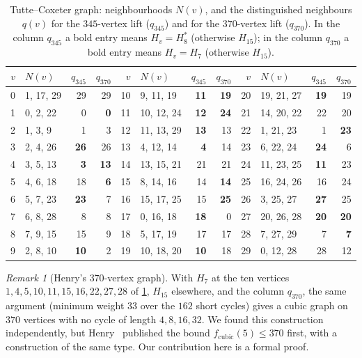 \documentclass[11pt]{amsart}
\theoremstyle{definition}
\theoremstyle{remark}
\newtheorem{remark}[theorem]{Remark}
\newcommand{\fc}{f_{\mathrm{cubic}}}
\newcommand{\Hseven}{H_7}
\newcommand{\Hfifteen}{H_{15}}
\newcommand{\Height}{H_8^{*}}
\begin{document}
\begin{table}[ht]
\centering
\caption{Tutte--Coxeter graph: neighbourhoods $N(v)$, and the distinguished
neighbours $q(v)$ for the $345$-vertex lift ($q_{345}$) and for the $370$-vertex
lift ($q_{370}$). In the column $q_{345}$ a bold entry means $H_v=\Height$
(otherwise $\Hfifteen$); in the column $q_{370}$ a bold entry means
$H_v=\Hseven$ (otherwise $\Hfifteen$).}
\label{tab:tc}
\footnotesize
\begin{tabular}{@{}rlrr@{\hspace{2.2em}}rlrr@{\hspace{2.2em}}rlrr@{}}
\toprule
$v$ & $N(v)$ & $q_{345}$ & $q_{370}$ & $v$ & $N(v)$ & $q_{345}$ & $q_{370}$ & $v$ & $N(v)$ & $q_{345}$ & $q_{370}$\\
\midrule
0 & 1, 17, 29 & 29 & 29 & 10 & 9, 11, 19 & \textbf{11} & \textbf{19} & 20 & 19, 21, 27 & \textbf{19} & 19\\
1 & 0, 2, 22 & 0 & \textbf{0} & 11 & 10, 12, 24 & \textbf{12} & \textbf{24} & 21 & 14, 20, 22 & 22 & 20\\
2 & 1, 3, 9 & 1 & 3 & 12 & 11, 13, 29 & \textbf{13} & 13 & 22 & 1, 21, 23 & 1 & \textbf{23}\\
3 & 2, 4, 26 & \textbf{26} & 26 & 13 & 4, 12, 14 & \textbf{4} & 14 & 23 & 6, 22, 24 & \textbf{24} & 6\\
4 & 3, 5, 13 & \textbf{3} & \textbf{13} & 14 & 13, 15, 21 & 21 & 21 & 24 & 11, 23, 25 & \textbf{11} & 23\\
5 & 4, 6, 18 & 18 & \textbf{6} & 15 & 8, 14, 16 & 14 & \textbf{14} & 25 & 16, 24, 26 & 16 & 24\\
6 & 5, 7, 23 & \textbf{23} & 7 & 16 & 15, 17, 25 & 15 & \textbf{25} & 26 & 3, 25, 27 & \textbf{27} & 25\\
7 & 6, 8, 28 & 8 & 8 & 17 & 0, 16, 18 & \textbf{18} & 0 & 27 & 20, 26, 28 & \textbf{20} & \textbf{20}\\
8 & 7, 9, 15 & 15 & 9 & 18 & 5, 17, 19 & 17 & 17 & 28 & 7, 27, 29 & 7 & \textbf{7}\\
9 & 2, 8, 10 & \textbf{10} & 2 & 19 & 10, 18, 20 & \textbf{10} & 18 & 29 & 0, 12, 28 & 28 & 12\\
\bottomrule
\end{tabular}
\end{table}

\begin{remark}[Henry's $370$-vertex graph]
With $\Hseven$ at the ten vertices $1,4,5,10,11,15,16,22,27,28$ of
\cref{tab:tc}, $\Hfifteen$ elsewhere, and the column $q_{370}$, the same
argument (minimum weight $33$ over the $162$ short cycles) gives a cubic graph
on $370$ vertices with no cycle of length $4,8,16,32$. We found this
construction independently, but Henry~\cite{Henry2026} published the bound
$\fc(5)\le 370$ first, with a construction of the same type. Our contribution
here is a formal proof.
\end{remark}
\end{document}
